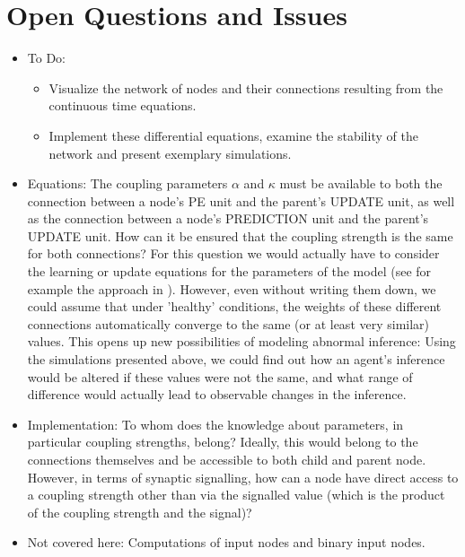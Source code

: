 \section{Open Questions and Issues}

\begin{itemize}
	\item To Do: 
	\begin{itemize}
		\item Visualize the network of nodes and their connections resulting from the continuous time equations.
		\item Implement these differential equations, examine the stability of the network and present exemplary simulations. 
	\end{itemize}
	
	\item Equations: The coupling parameters $\alpha$ and $\kappa$ must be available to both the connection between a node's \textsf{PE unit} and the parent's \textsf{UPDATE unit}, as well as the connection between a node's \textsf{PREDICTION unit} and the parent's \textsf{UPDATE unit}. How can it be ensured that the coupling strength is the same for both connections? For this question we would actually have to consider the learning or update equations for the parameters of the model (see for example the approach in \cite{Bogacz2017}). However, even without writing them down, we could assume that under 'healthy' conditions, the weights of these different connections automatically converge to the same (or at least very similar) values. This opens up new possibilities of modeling abnormal inference: Using the simulations presented above, we could find out how an agent's inference would be altered if these values were not the same, and what range of difference would actually lead to observable changes in the inference. 

	\item Implementation: To whom does the knowledge about parameters, in particular coupling strengths, belong? Ideally, this would belong to the connections themselves and be accessible to both child and parent node. However, in terms of synaptic signalling, how can a node have direct access to a coupling strength other than via the signalled value (which is the product of the coupling strength and the signal)?

	\item Not covered here: Computations of input nodes and binary input nodes.
\end{itemize}